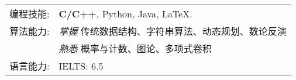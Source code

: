 %
%



\renewcommand{\arraystretch}{1.1}

	\begin{tabular}{>{}r>{}p{13cm}}
		\textsc{编程技能:}      &  \textbf{C/C++}, Python, Java, \LaTeX.\\
		\textsc{算法能力:}	    &  \emph{掌握}  传统数据结构、字符串算法、动态规划、数论反演  \\
		                 	   &  \emph{熟悉}  概率与计数、图论、多项式卷积  \\
		\textsc{语言能力:} 		&  IELTS: 6.5\\
	\end{tabular}